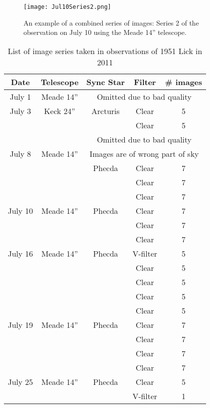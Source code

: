 \documentclass[12pt,journal,compsoc]{IEEEtran}
\begin{document}
\begin{figure}[!t]
\centering
\texttt{[image: Jul10Series2.png]}
\caption{An example of a combined series of images: Series 2 of the observation on July 10 using the Meade 14'' telescope.\label{fig:exampleseries}}
\label{fig_sim}
\end{figure}

\begin{table}[!t]
\centering
\begin{tabular}{|c|c|c|c|c|}
\hline
Date & Telescope & Sync Star & Filter & \# images \\ \hline \hline
July 1 &Meade 14''& \multicolumn{3}{c|}{Omitted due to bad quality}\\ \hline \hline
July 3 & Keck 24''& Arcturis & Clear & 5 \\ \cline{4-5}
 & & & Clear & 5\\ \cline{3-5}
 & & \multicolumn{3}{c|}{Omitted due to bad quality} \\ \hline \hline
July 8 & Meade 14'' &\multicolumn{3}{c|}{Images are of wrong part of sky} \\ \cline{3-5}
 & & Phecda & Clear & 7 \\ \cline{4-5}
 & & & Clear & 7\\ \cline{4-5}
 & & & Clear & 7\\ \hline \hline
July 10 & Meade 14''& Phecda & Clear &7 \\ \cline{4-5}
 & & & Clear & 7\\ \cline{4-5}
 & & & Clear & 7\\ \hline \hline
July 16 & Meade 14''& Phecda & V-filter &5 \\ \cline{4-5}
 & & & Clear & 5\\ \cline{4-5}
 & & & Clear & 5\\ \cline{4-5}
 & & & Clear & 5\\ \cline{4-5}
 & & & Clear & 5\\ \hline \hline
July 19 & Meade 14''& Phecda & Clear &7 \\ \cline{4-5}
 & & & Clear & 7\\ \cline{4-5}
 & & & Clear & 7\\ \cline{4-5}
 & & & Clear & 7\\ \hline \hline
July 25 & Meade 14'' & Phecda & Clear &5 \\ \cline{4-5}
 & & & V-filter & 1\\ \hline
\end{tabular}
\caption{List of image series taken in observations of 1951 Lick in 2011\label{tab:serieslist}}
\end{table}
\end{document}
